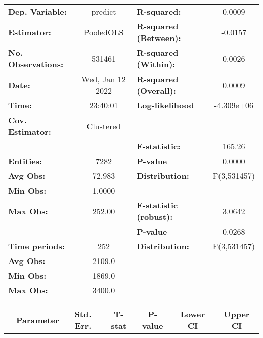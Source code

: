 \begin{center}
\begin{tabular}{lclc}
\toprule
\textbf{Dep. Variable:}    &      predict       & \textbf{  R-squared:         }   &      0.0009      \\
\textbf{Estimator:}        &     PooledOLS      & \textbf{  R-squared (Between):}  &     -0.0157      \\
\textbf{No. Observations:} &       531461       & \textbf{  R-squared (Within):}   &      0.0026      \\
\textbf{Date:}             &  Wed, Jan 12 2022  & \textbf{  R-squared (Overall):}  &      0.0009      \\
\textbf{Time:}             &      23:40:01      & \textbf{  Log-likelihood     }   &    -4.309e+06    \\
\textbf{Cov. Estimator:}   &     Clustered      & \textbf{                     }   &                  \\
\textbf{}                  &                    & \textbf{  F-statistic:       }   &      165.26      \\
\textbf{Entities:}         &        7282        & \textbf{  P-value            }   &      0.0000      \\
\textbf{Avg Obs:}          &       72.983       & \textbf{  Distribution:      }   &   F(3,531457)    \\
\textbf{Min Obs:}          &       1.0000       & \textbf{                     }   &                  \\
\textbf{Max Obs:}          &       252.00       & \textbf{  F-statistic (robust):} &      3.0642      \\
\textbf{}                  &                    & \textbf{  P-value            }   &      0.0268      \\
\textbf{Time periods:}     &        252         & \textbf{  Distribution:      }   &   F(3,531457)    \\
\textbf{Avg Obs:}          &       2109.0       & \textbf{                     }   &                  \\
\textbf{Min Obs:}          &       1869.0       & \textbf{                     }   &                  \\
\textbf{Max Obs:}          &       3400.0       & \textbf{                     }   &                  \\
\bottomrule
\end{tabular}
\begin{tabular}{lcccccc}
                & \textbf{Parameter} & \textbf{Std. Err.} & \textbf{T-stat} & \textbf{P-value} & \textbf{Lower CI} & \textbf{Upper CI}  \\

\end{tabular}
\end{center}
